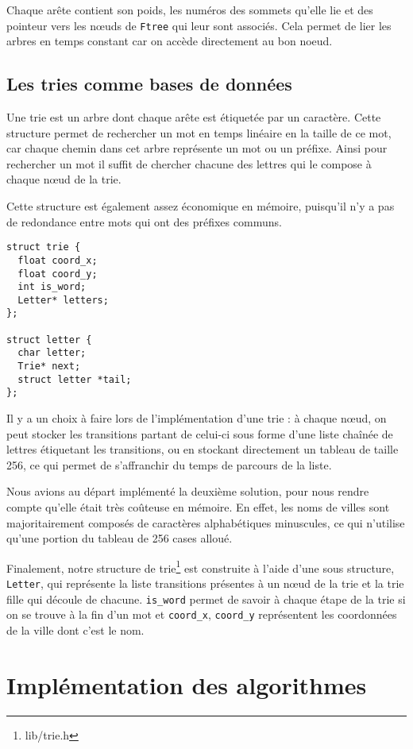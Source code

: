 \documentclass[a4paper]{article}
\begin{document}
Chaque arête contient son poids, les numéros des sommets qu'elle lie et des pointeur vers les nœuds de \texttt{Ftree} qui leur sont associés. Cela permet de lier les arbres en temps constant car on accède directement au bon noeud.

\subsection{Les tries comme bases de données}

Une trie est un arbre dont chaque arête est étiquetée par un caractère. Cette structure permet de rechercher un mot en temps linéaire en la taille de ce mot, car chaque chemin dans cet arbre représente un mot ou un préfixe. Ainsi pour rechercher un mot il suffit de chercher chacune des lettres qui le compose à chaque nœud de la trie.

Cette structure est également assez économique en mémoire, puisqu'il n'y a pas de redondance entre mots qui ont des préfixes communs.

\begin{verbatim}
struct trie {
  float coord_x;
  float coord_y;
  int is_word;
  Letter* letters;
};

struct letter {
  char letter;
  Trie* next;
  struct letter *tail;
};
\end{verbatim}

Il y a un choix à faire lors de l'implémentation d'une trie : à chaque nœud, on peut stocker les transitions partant de celui-ci sous forme d'une liste chaînée de lettres étiquetant les transitions, ou en stockant directement un tableau de taille 256, ce qui permet de s'affranchir du temps de parcours de la liste.

Nous avions au départ implémenté la deuxième solution, pour nous rendre compte qu'elle était très coûteuse en mémoire. En effet, les noms de villes sont majoritairement composés de caractères alphabétiques minuscules, ce qui n'utilise qu'une portion du tableau de 256 cases alloué.

Finalement, notre structure de trie\footnote{lib/trie.h} est construite à l'aide d'une sous structure, \texttt{Letter}, qui représente la liste transitions présentes à un nœud de la trie et la trie fille qui découle de chacune. \texttt{is\_word} permet de savoir à chaque étape de la trie si on se trouve à la fin d'un mot et \texttt{coord\_x}, \texttt{coord\_y} représentent les coordonnées de la ville dont c'est le nom.

\section{Implémentation des algorithmes}
\end{document}
